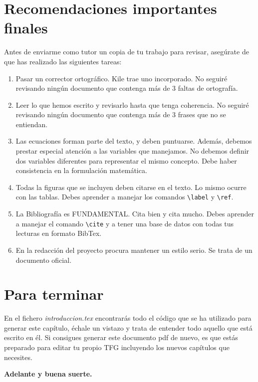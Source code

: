 \section{Recomendaciones importantes finales}
Antes de enviarme como tutor un copia de tu trabajo para revisar, asegúrate de que has realizado las siguientes tareas:
\begin{enumerate}
 \item Pasar un corrector ortográfico. Kile trae uno incorporado. No seguiré revisando ningún documento que contenga más de 3 faltas de ortografía.
 \item Leer lo que hemos escrito y revisarlo hasta que tenga coherencia. No seguiré revisando ningún documento que contenga más de 3 frases que no se entiendan.
 \item Las ecuaciones forman parte del texto, y deben puntuarse. Además, debemos prestar especial atención a las variables que manejamos. No debemos definir dos variables diferentes para representar el mismo concepto. Debe haber consistencia en la formulación matemática.
 \item Todas la figuras que se incluyen deben citarse en el texto. Lo mismo ocurre con las tablas. Debes aprender a manejar los comandos \verb+\label+ y \verb+\ref+.
 \item La Bibliografía es FUNDAMENTAL. Cita bien y cita mucho.  Debes aprender a manejar el comando \verb+\cite+ y a tener una base de datos con todas tus lecturas en formato BibTex.
 \item En la redacción del proyecto procura mantener un estilo serio. Se trata de un documento oficial.
\end{enumerate}


\section{Para terminar}
En el fichero \textit{introduccion.tex} encontrarás todo el código que se ha utilizado para generar este capítulo, échale un vistazo y trata de entender todo aquello que está escrito en él. Si consigues generar este documento pdf de nuevo, es que estás preparado para editar tu propio \ac{TFG} incluyendo los nuevos capítulos que necesites.

\begin{center}
\begin{large}\textbf{Adelante y buena suerte.}\end{large}
\end{center}

